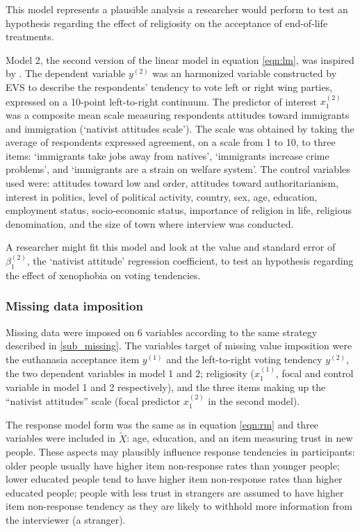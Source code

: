 	This model represents a plausible analysis a researcher would perform to test an hypothesis regarding the 
	effect of religiosity on the acceptance of end-of-life treatments.

	Model 2, the second version of the linear model in equation \ref{eqn:lm}, was inspired by \cite{immerzeel:2015}.
	The dependent variable $y^{(2)}$ was an harmonized variable constructed by EVS to describe the respondents' 
	tendency to vote left or right wing parties, expressed on a 10-point left-to-right continuum.
	The predictor of interest $x^{(2)}_{1}$ was a composite mean scale measuring respondents attitudes toward immigrants 
	and immigration (`nativist attitudes scale').
	The scale was obtained by taking the average of respondents expressed agreement, on a scale from 
	1 to 10, to three items: `immigrants take jobs away from natives', `immigrants increase crime problems', and 
	`immigrants are a strain on welfare system'.
	The control variables used were: 
	attitudes toward low and order, attitudes toward authoritarianism, interest in politics, level of political activity,  
	country, sex, age, education, employment status, socio-economic status, importance of religion in life, 
	religious denomination, and the size of town where interview was conducted.

	A researcher might fit this model and look at the value and standard error of $\beta^{(2)}_{1}$, 
	the `nativist attitude' regression coefficient, to test an hypothesis regarding the effect of xenophobia on voting 
	tendencies.

\subsubsection{Missing data imposition}

	Missing data were imposed on 6 variables according to the same strategy described in \ref{sub_missing}.
	The variables target of missing value imposition were the euthanasia acceptance item $y^{(1)}$ and the 
	left-to-right voting tendency $y^{(2)}$, the two dependent variables in model 1 and 2; 
	religiosity ($x^{(1)}_{1}$, focal and control variable in model 1 and 2 respectively), 
	and the three items making up the ``nativist attitudes'' scale (focal predictor $x^{(2)}_{1}$
	in the second model).

	The response model form was the same as in equation \ref{eqn:rm} and three variables were included in $\tilde{X}$: 
	age, education, and an item measuring trust in new people. 
	These aspects may plausibly influence response tendencies in participants: 
	older people usually have higher item non-response rates than younger people;
	lower educated people tend to have higher item non-response rates than higher educated people;
	people with less trust in strangers are assumed to have higher item non-response tendency as they
	are likely to withhold more information from the interviewer (a stranger).

